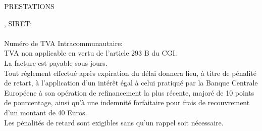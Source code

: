 \documentclass{invoice}
\begin{document}
\vspace*{120 pt}

\hspace{8 pt}\color{gray}\MakeUppercase{Prestations}\\[-1.6ex]
\hline

\color{black}





\vspace{1 cm}
\vspace*{\fill}
\begin{center}
	\footnotesize{, SIRET: }\\
	\footnotesize{}\\
	\footnotesize{Numéro de TVA Intracommunautaire: }\\
	\footnotesize{
		TVA non applicable en vertu de l'article 293 B du CGI.
	}\\
	\footnotesize{La facture est payable sous  jours.}\\
		\footnotesize{}
		\footnotesize{Tout réglement effectué après expiration du délai donnera lieu, à titre de pénalité de retart, à l'application
			d'un intérêt égal à celui pratiqué par la Banque Centrale Européene à son opération de refinancement la plus récente,
			majoré de 10 points de pourcentage, ainsi qu'à une indemnité forfaitaire pour frais de recouvrement d'un montant de 40 Euros.}\\
		\footnotesize{Les pénalités de retard sont exigibles sans qu'un rappel soit nécessaire.}

\end{center}
\end{document}
